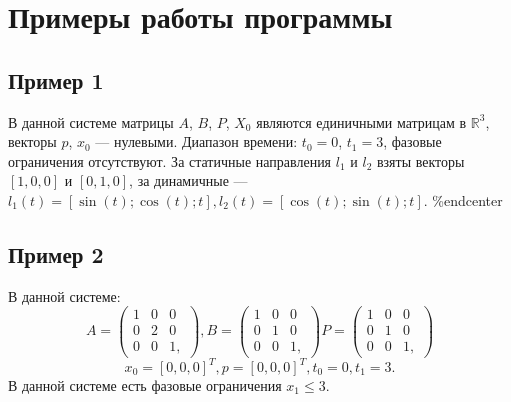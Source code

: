 \documentclass[a4paper, 14pt]{article}
\begin{document}
\section{Примеры работы программы}
	\subsection{Пример 1}
		В данной системе матрицы $A$, $B$, $P$, $X_0$ являются единичными матрицам в $\mathbb{R}^3$, векторы $p$, $x_0$ --- нулевыми. Диапазон времени: $t_0 = 0$, $t_1 = 3$, фазовые ограничения отсутствуют. За статичные направления $l_1$ и $l_2$ взяты векторы $[1, 0, 0]$ и $[0, 1, 0]$, за динамичные --- $l_1(t) = [\sin(t); \cos(t); t], l_2(t) = [\cos(t); \sin(t); t]$.
	\%end{center}			
	\subsection{Пример 2}
	В данной системе:
	$$A =
	\begin{pmatrix}
		1 & 0 & 0 \\
		0 & 2 & 0 \\
		0 & 0 & 1,
	\end{pmatrix}, 
	B = 
	\begin{pmatrix}
		1 & 0 & 0 \\
		0 & 1 & 0 \\
		0 & 0 & 1,
	\end{pmatrix}
	P = 
	\begin{pmatrix}
		1 & 0 & 0 \\
		0 & 1 & 0 \\
		0 & 0 & 1,
	\end{pmatrix}
	$$	
	$$
		x_0 = [0, 0, 0]^{T}, p = [0, 0, 0]^{T}, t_0 = 0, t_1 = 3.
	$$
	В данной системе есть фазовые ограничения $x_1 \leqslant 3$.
		
\end{document}
